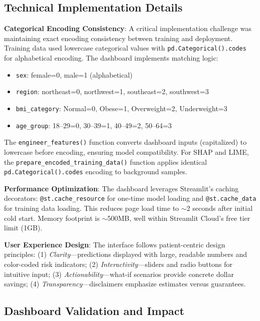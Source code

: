 \documentclass[conference]{IEEEtran}
\begin{document}
\subsection{Technical Implementation Details}

\textbf{Categorical Encoding Consistency}: A critical implementation challenge was maintaining exact encoding consistency between training and deployment. Training data used lowercase categorical values with \texttt{pd.Categorical().codes} for alphabetical encoding. The dashboard implements matching logic:

\begin{itemize}
\item \texttt{sex}: female=0, male=1 (alphabetical)
\item \texttt{region}: northeast=0, northwest=1, southeast=2, southwest=3
\item \texttt{bmi\_category}: Normal=0, Obese=1, Overweight=2, Underweight=3
\item \texttt{age\_group}: 18--29=0, 30--39=1, 40--49=2, 50--64=3
\end{itemize}

The \texttt{engineer\_features()} function converts dashboard inputs (capitalized) to lowercase before encoding, ensuring model compatibility. For SHAP and LIME, the \texttt{prepare\_encoded\_training\_data()} function applies identical \texttt{pd.Categorical().codes} encoding to background samples.

\textbf{Performance Optimization}: The dashboard leverages Streamlit's caching decorators: \texttt{@st.cache\_resource} for one-time model loading and \texttt{@st.cache\_data} for training data loading. This reduces page load time to $\sim$2 seconds after initial cold start. Memory footprint is $\sim$500MB, well within Streamlit Cloud's free tier limit (1GB).

\textbf{User Experience Design}: The interface follows patient-centric design principles: (1) \textit{Clarity}---predictions displayed with large, readable numbers and color-coded risk indicators; (2) \textit{Interactivity}---sliders and radio buttons for intuitive input; (3) \textit{Actionability}---what-if scenarios provide concrete dollar savings; (4) \textit{Transparency}---disclaimers emphasize estimates versus guarantees.

\subsection{Dashboard Validation and Impact}
\end{document}
